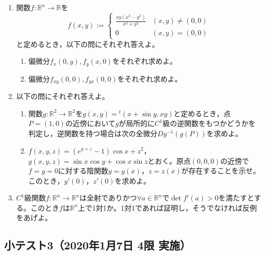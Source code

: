 \documentclass[dvipdfmx,a4j,10pt]{jsarticle}
\theoremstyle{mystyle1}
\theoremstyle{mystyle2}
\begin{document}
\begin{enumerate}
    \item 関数$f:\mathbb{R}^n\to\mathbb{R}$を
        \[
        f(x,y):=
        \begin{cases}
            \displaystyle\frac{xy(x^2-y^2)}{x^2+y^2} & (x,y)\neq(0,0) \\
            0 & (x,y)=(0,0)
        \end{cases}
        \]
        と定めるとき，以下の問にそれぞれ答えよ。
        \begin{enumerate}\renewcommand{\labelenumii}{(\arabic{enumii})}
            \item 偏微分$f_x(0,y),f_y(x,0)$をそれぞれ求めよ。
            \item 偏微分$f_{xy}(0,0),f_{yx}(0,0)$をそれぞれ求めよ。
        \end{enumerate}
    \item 以下の問にそれぞれ答えよ。
        \begin{enumerate}\renewcommand{\labelenumii}{(\arabic{enumii})}
            \item 関数$g:\mathbb{R}^2\to\mathbb{R}^2$を$g(x,y)={}^t(x+\sin y,xy)$と定めるとき，点$P=(1,0)$の近傍において$g$が局所的に$C^1$級の逆関数をもつかどうかを判定し，逆関数を持つ場合は次の全微分$Dg^{-1}(g(P))$を求めよ。
            \item $f(x,y,z)=(e^{y+z}-1)\cos x+z^2$，$g(x,y,z)=\sin x\cos y+\cos x\sin z$とおく。原点$(0,0,0)$の近傍で$f=g=0$に対する陰関数$y=y(x)$，$z=z(x)$が存在することを示せ。このとき，$y'(0)$，$z'(0)$を求めよ。
        \end{enumerate}
    \item $C^1$級関数$f:\mathbb{R}^n\to\mathbb{R}^n$は全射でありかつ$\forall a\in\mathbb{R}^n$で$\det f'(a)>0$を満たすとする。このとき$f$は$\mathbb{R}^n$上で1対1か。1対1であれば証明し，そうでなければ反例をあげよ。
\end{enumerate}

\subsection{小テスト3（2020年1月7日 4限 実施）}
\end{document}
